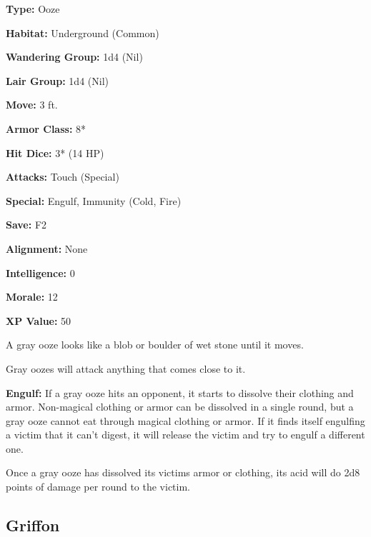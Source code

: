 \begin{multicols*}{2}
{{\textbf{Type:} Ooze

\textbf{Habitat:} Underground (Common)

\textbf{Wandering Group:} 1d4 (Nil)

\textbf{Lair Group:} 1d4 (Nil)

\textbf{Move:} 3 ft.

\textbf{Armor Class:} 8*

\textbf{Hit Dice:} 3* (14 HP)

\textbf{Attacks:} Touch (Special)

\textbf{Special:} Engulf, Immunity (Cold, Fire)

\textbf{Save:} F2

\textbf{Alignment:} None

\textbf{Intelligence:} 0

\textbf{Morale:} 12

\textbf{XP Value:} 50}}

A gray ooze looks like a blob or boulder of wet stone until it moves.

Gray oozes will attack anything that comes close to it.

\textbf{Engulf:} If a gray ooze hits an opponent, it starts to dissolve their clothing and armor. Non-magical clothing or armor can be dissolved in a single round, but a gray ooze cannot eat through magical clothing or armor. If it finds itself engulfing a victim that it can’t digest, it will release the victim and try to engulf a different one.

Once a gray ooze has dissolved its victims armor or clothing, its acid will do 2d8 points of damage per round to the victim.

\subsection{Griffon}\label{monster:Griffon}
\end{multicols*}
